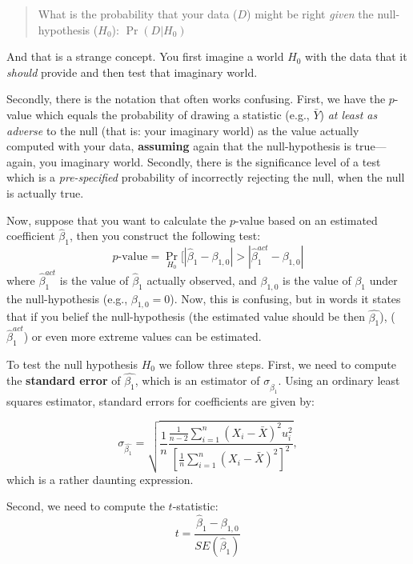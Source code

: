 \documentclass[
]{book}
\begin{document}
\begin{quote}
What is the probability that your data (\(D\)) might be right \emph{given} the null-hypothesis (\(H_0\)): \(\Pr(D|H_0)\)
\end{quote}

And that is a strange concept. You first imagine a world \(H_0\) with the data that it \emph{should} provide and then test that imaginary world.

Secondly, there is the notation that often works confusing. First, we have the \(p\)-value which equals the probability of drawing a statistic (e.g., \(\bar{Y}\)) \emph{at least as adverse} to the null (that is: your imaginary world) as the value actually computed with your data, \textbf{assuming} again that the null-hypothesis is true---again, you imaginary world. Secondly, there is the significance level of a test which is a \emph{pre-specified} probability of incorrectly rejecting the null, when the null is actually true.

Now, suppose that you want to calculate the \(p\)-value based on an estimated coefficient \(\hat{\beta}_1\), then you construct the following test:
\begin{equation}
 p\text{-value} = \Pr_{H_0}[|\hat{\beta}_1 - \beta_{1,0}| > |\hat{\beta}_1^{act} - \beta_{1,0}| 
\end{equation}
where \(\hat{\beta}_1^{act}\) is the value of \(\hat{\beta}_1\) actually observed, and \(\beta_{1,0}\) is the value of \(\beta_1\) under the null-hypothesis (e.g., \(\beta_{1,0} = 0\)). Now, this is confusing, but in words it states that if you belief the null-hypothesis (the estimated value should be then \(\hat{\beta_1}\)), (\(\hat{\beta}_1^{act}\)) or even more extreme values can be estimated.

To test the null hypothesis \(H_0\) we follow three steps. First, we need to compute the \textbf{standard error} of \(\hat{\beta_1}\), which is an estimator of \(\sigma_{\hat{\beta_1}}\). Using an ordinary least squares estimator, standard errors for coefficients are given by:

\begin{equation}
\sigma_{\hat{\beta_1}} = \sqrt{\frac{1}{n} \frac{\frac{1}{n-2} \sum_{i=1}^n (X_i - \bar{X})^2 u_i^2}{\left[\frac{1}{n} \sum_{i=1}^n (X_i - \bar{X})^2 \right]^2}},
\label{eq:olsse}
\end{equation}
which is a rather daunting expression.

Second, we need to compute the \(t\)-statistic:
\begin{equation}
t = \frac{\hat{\beta}_1 - \beta_{1,0}}{SE(\hat{\beta}_1)}
\label{eq:olst}
\end{equation}
\end{document}
